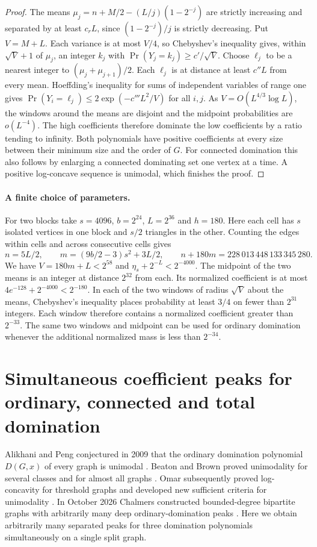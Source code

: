 \documentclass[11pt,a4paper]{article}
\begin{document}
\begin{proof}
The means $\mu_j=n+M/2-(L/j)(1-2^{-j})$ are strictly increasing
and separated by at least $c_r L$, since
$(1-2^{-j})/j$ is strictly decreasing. Put $V=M+L$.
Each variance is at most $V/4$, so Chebyshev's inequality gives,
within $\sqrt V+1$ of $\mu_j$, an integer $k_j$ with
$\Pr(Y_j=k_j)\ge c'/\sqrt V$. Choose $\ell_j$ to be a nearest
integer to $(\mu_j+\mu_{j+1})/2$. Each $\ell_j$ is at distance
at least $c''L$ from every mean. Hoeffding's inequality for sums of
independent variables of range one gives
$\Pr(Y_i=\ell_j)\le 2\exp(-c'''L^2/V)$ for all $i,j$.
As $V=O(L^{4/3}\log L)$, the windows around the means are disjoint
and the midpoint probabilities are $o(L^{-4})$. The high coefficients
therefore dominate the low coefficients by a ratio tending to infinity.
Both polynomials have positive coefficients at every size between
their minimum size and the order of $G$. For connected domination this
also follows by enlarging a connected dominating set one vertex at a
time. A positive log-concave sequence is unimodal, which finishes the proof.
\end{proof}

\paragraph{A finite choice of parameters.}
For two blocks take $s=4096$, $b=2^{24}$, $L=2^{36}$ and $h=180$.
Here each cell has $s$ isolated vertices in one block and $s/2$ triangles
in the other. Counting the edges within cells and across consecutive cells gives
\[
 n=5L/2,\qquad m=(9b/2-3)s^2+3L/2,\qquad
 n+180m=228\,013\,448\,133\,345\,280.
\]
We have $V=180m+L<2^{58}$ and $\eta_s+2^{-L}<2^{-4000}$.
The midpoint of the two means is an integer at distance $2^{32}$ from
each. Its normalized coefficient is at most
$4e^{-128}+2^{-4000}<2^{-180}$. In each of the two windows of radius
$\sqrt V$ about the means, Chebyshev's inequality places probability
at least $3/4$ on fewer than $2^{31}$ integers. Each window therefore
contains a normalized coefficient greater than $2^{-33}$.
The same two windows and midpoint can be used for ordinary domination
whenever the additional normalized mass is less than $2^{-34}$.

\section{Simultaneous coefficient peaks for ordinary, connected and total domination}
\label{sec:ordinary-domination}

Alikhani and Peng conjectured in 2009 that the ordinary domination
polynomial $D(G,x)$ of every graph is unimodal
\cite[Section~3, after Theorem~6]{alipeng}. Beaton and Brown proved
unimodality for several classes and for almost all graphs
\cite{beatonshape}. Omar subsequently proved log-concavity for
threshold graphs and developed new sufficient criteria for
unimodality \cite{omar}. In October 2026 Chalmers constructed bounded-degree bipartite graphs with arbitrarily many deep ordinary-domination peaks \cite{chalmers}. Here we obtain arbitrarily
many separated peaks for three domination polynomials simultaneously
on a single split graph.
\end{document}
